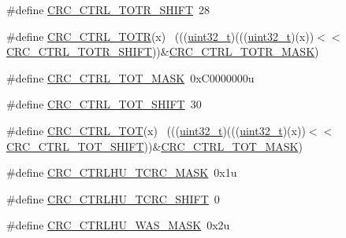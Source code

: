 \begin{DoxyCompactItemize}
\item 
\#define \hyperlink{group___c_r_c___register___masks_gab309d177a917d972212c78481cf25d4d}{C\+R\+C\+\_\+\+C\+T\+R\+L\+\_\+\+T\+O\+T\+R\+\_\+\+S\+H\+I\+FT}~28
\item 
\#define \hyperlink{group___c_r_c___register___masks_gad9b6420cda76f25cebee4315a10317e6}{C\+R\+C\+\_\+\+C\+T\+R\+L\+\_\+\+T\+O\+TR}(x)                                              ~(((\hyperlink{_p_e___types_8h_a33594304e786b158f3fb30289278f5af}{uint32\+\_\+t})(((\hyperlink{_p_e___types_8h_a33594304e786b158f3fb30289278f5af}{uint32\+\_\+t})(x))$<$$<$\hyperlink{group___c_r_c___register___masks_gab309d177a917d972212c78481cf25d4d}{C\+R\+C\+\_\+\+C\+T\+R\+L\+\_\+\+T\+O\+T\+R\+\_\+\+S\+H\+I\+FT}))\&\hyperlink{group___c_r_c___register___masks_ga1af35cbb29862b18aee64fd4f32bca07}{C\+R\+C\+\_\+\+C\+T\+R\+L\+\_\+\+T\+O\+T\+R\+\_\+\+M\+A\+SK})
\item 
\#define \hyperlink{group___c_r_c___register___masks_ga66da08ca8e22cd72c74e4b3cf53df7dd}{C\+R\+C\+\_\+\+C\+T\+R\+L\+\_\+\+T\+O\+T\+\_\+\+M\+A\+SK}~0x\+C0000000u
\item 
\#define \hyperlink{group___c_r_c___register___masks_gaad1005ea5864ca6795a27b3f7db38ea6}{C\+R\+C\+\_\+\+C\+T\+R\+L\+\_\+\+T\+O\+T\+\_\+\+S\+H\+I\+FT}~30
\item 
\#define \hyperlink{group___c_r_c___register___masks_ga13375c3e505a73a0b114542b7476dbff}{C\+R\+C\+\_\+\+C\+T\+R\+L\+\_\+\+T\+OT}(x)                                                ~(((\hyperlink{_p_e___types_8h_a33594304e786b158f3fb30289278f5af}{uint32\+\_\+t})(((\hyperlink{_p_e___types_8h_a33594304e786b158f3fb30289278f5af}{uint32\+\_\+t})(x))$<$$<$\hyperlink{group___c_r_c___register___masks_gaad1005ea5864ca6795a27b3f7db38ea6}{C\+R\+C\+\_\+\+C\+T\+R\+L\+\_\+\+T\+O\+T\+\_\+\+S\+H\+I\+FT}))\&\hyperlink{group___c_r_c___register___masks_ga66da08ca8e22cd72c74e4b3cf53df7dd}{C\+R\+C\+\_\+\+C\+T\+R\+L\+\_\+\+T\+O\+T\+\_\+\+M\+A\+SK})
\item 
\#define \hyperlink{group___c_r_c___register___masks_ga1d62eb284fb7d178fddaf03e10dcd19c}{C\+R\+C\+\_\+\+C\+T\+R\+L\+H\+U\+\_\+\+T\+C\+R\+C\+\_\+\+M\+A\+SK}~0x1u
\item 
\#define \hyperlink{group___c_r_c___register___masks_ga9299763dd32745d443ab84a9911ad775}{C\+R\+C\+\_\+\+C\+T\+R\+L\+H\+U\+\_\+\+T\+C\+R\+C\+\_\+\+S\+H\+I\+FT}~0
\item 
\#define \hyperlink{group___c_r_c___register___masks_ga9c716f81782ec7e214f823ef98fa8eb3}{C\+R\+C\+\_\+\+C\+T\+R\+L\+H\+U\+\_\+\+W\+A\+S\+\_\+\+M\+A\+SK}~0x2u
\item 

\end{DoxyCompactItemize}
